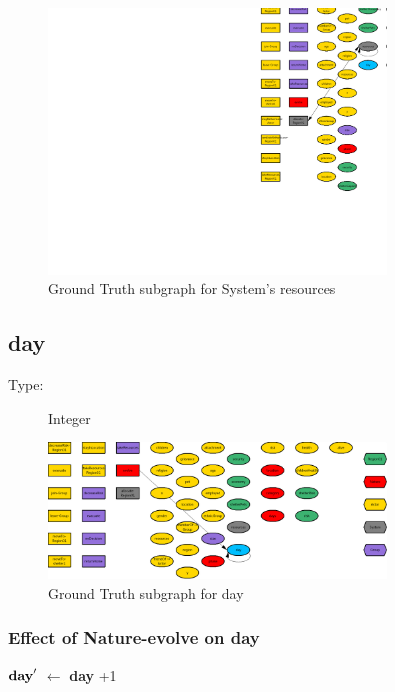 \documentclass{article}%
\begin{document}
\begin{figure}[ht]%
\centering%
\includegraphics[width=0.8\textwidth]{images/resourcesOfSystem.png}%
\caption{Ground Truth subgraph for System's resources}%
\end{figure}

%
\subsection{day}%
\label{subsec:day}%
\begin{description}%
\item[Type:]%
Integer%
\end{description}%


\begin{figure}[ht]%
\centering%
\includegraphics[width=0.8\textwidth]{images/day.png}%
\caption{Ground Truth subgraph for day}%
\end{figure}

%
\subsubsection{Effect of Nature{-}evolve on day}%
\label{ssubsec:Effect of Nature{-}evolve on day}%
\begin{flushleft}%
$\mbox{\textbf{day}} '$%
$\leftarrow$%
\textbf{day}%
+1%
\end{flushleft}
\end{document}

